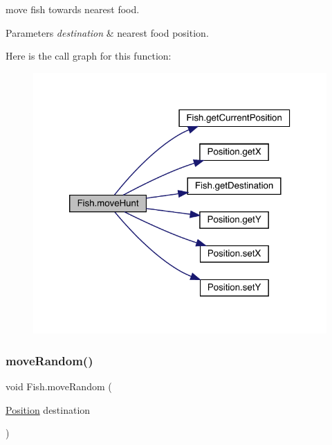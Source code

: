 move fish towards nearest food. 
\begin{DoxyParams}{Parameters}
{\em destination} & nearest food position. \\
\hline
\end{DoxyParams}
Here is the call graph for this function\+:
\nopagebreak
\begin{figure}[H]
\begin{center}
\leavevmode
\includegraphics[width=320pt]{class_fish_a8ac2c9963873520d435ee1609dae0174_cgraph}
\end{center}
\end{figure}
\mbox{\label{class_fish_aa3683716f71b574717c30f0f7be3ec33}} 
\subsubsection{\texorpdfstring{move\+Random()}{moveRandom()}}
{\footnotesize\ttfamily void Fish.\+move\+Random (\begin{DoxyParamCaption}\item[{\mbox{\hyperlink{class_position}{Position}}}]{destination }\end{DoxyParamCaption})\hspace{0.3cm}{\ttfamily [inline]}}

